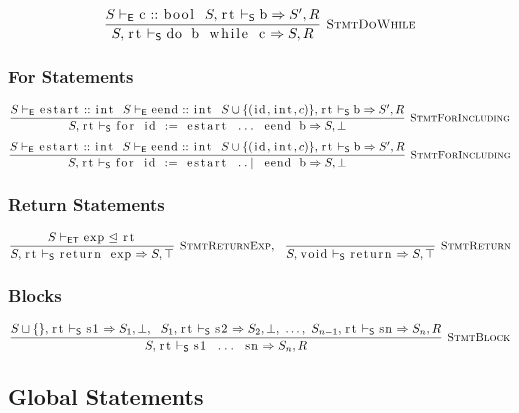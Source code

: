 \documentclass{article}
\newcommand{\code}[1]{\lstinline[columns=fixed]{#1}}
\newcommand{\drmrule}[5]{\frac{#1}{#2\vdash_{\mathsf{#3}}#4}\textsc{\ \small{#5}}}
\newcommand{\ruleapp}[1]{\vdash_{\mathsf{#1}}}
\newcommand{\mc}[1]{\textnormal{\code{#1}}}
\begin{document}
				\begin{align*}
					\drmrule{S\ruleapp{E}\mc{c} :: \mc{bool}\ \ S,\mc{rt}\ruleapp{S}\mc{b}\Rightarrow S',R}{S,\mc{rt}}{S}{\mc{do b while c} \Rightarrow S,R}{StmtDoWhile}
				\end{align*}
				
			\subsubsection{For Statements}
			
				\begin{align*}
					\drmrule{S\ruleapp{E}\mc{estart}::\mc{int}\ \ S\ruleapp{E}\mc{eend}::\mc{int}\ \ S\cup \{ (\mc{id},\mc{int},c) \},\mc{rt}\ruleapp{S} \mc{b}\Rightarrow S',R}{S,\mc{rt}}{S}{\mc{for id := estart ... eend b} \Rightarrow S,\bot}{StmtForIncluding}
				\end{align*}
				\begin{align*}
					\drmrule{S\ruleapp{E}\mc{estart}::\mc{int}\ \ S\ruleapp{E}\mc{eend}::\mc{int}\ \ S\cup \{ (\mc{id},\mc{int},c) \},\mc{rt}\ruleapp{S} \mc{b}\Rightarrow S',R}{S,\mc{rt}}{S}{\mc{for id := estart ..| eend b} \Rightarrow S,\bot}{StmtForIncluding}
				\end{align*}
			
			\subsubsection{Return Statements}
			
				\begin{align*}
					\drmrule{S\ruleapp{ET}\mc{exp}\trianglelefteq\mc{rt}}{S,\mc{rt}}{S}{\mc{return exp} \Rightarrow S,\top}{StmtReturnExp},\ \  \drmrule{}{S,\mc{void}}{S}{\mc{return}\Rightarrow S,\top}{StmtReturn}
				\end{align*}
				
			\subsubsection{Blocks}
			
				\begin{align*}
					\drmrule{S\sqcup\{\},\mc{rt}\ruleapp{S}\mc{s1} \Rightarrow S_1,\bot,\ \ S_1,\mc{rt}\ruleapp{S}\mc{s2} \Rightarrow S_2,\bot,\ \dots,\ S_{n-1},\mc{rt}\ruleapp{S}\mc{sn} \Rightarrow S_n,R}{S,\mc{rt}}{S}{\mc{s1 ... sn} \Rightarrow S_n,R}{StmtBlock}
				\end{align*}
		
		\subsection{Global Statements}
		
\end{document}
